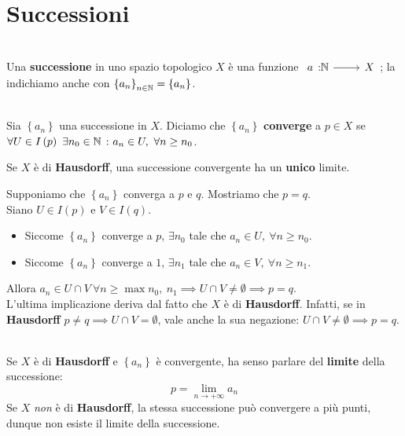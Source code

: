 \section{Successioni}
\begin{define}[Successione.]~{}\\
Una \textbf{successione} in uno spazio topologico $X$ è una funzione $\funz{a}{\naturalset}{X}$; la indichiamo anche con $\left\{a_n\right\}_{n\in\mathbb{N}}=\left\{a_n\right\}$.
\end{define}
\begin{define}~{}\\
Sia $\left\{a_n\right\}$ una successione in $X$. Diciamo che $\left\{a_n\right\}$ \textbf{converge} a $p\in X$ se $\forall U\in I\left(p\right)\ \exists n_0\in \mathbb{N}\ \colon a_n\in U,\ \forall n\geq n_0$.
\end{define}
\begin{observe}
	Se $X$ è di \textbf{Hausdorff}, una successione convergente ha un \textbf{unico} limite.
\end{observe}
\begin{demonstration}
	Supponiamo che $\left\{a_n\right\}$ converga a $p$ e $q$. Mostriamo che $p=q$.\\
	Siano $U\in I\left(p\right)$ e $V\in I\left(q\right)$.
	\begin{itemize}
		\item Siccome $\left\{a_n\right\}$ converge a $p$, $\exists n_0$ tale che $a_n\in U,\ \forall n\geq n_0$.
		\item Siccome $\left\{a_n\right\}$ converge a $1$, $\exists n_1$ tale che $a_n\in V,\ \forall n\geq n_1$.
	\end{itemize}
Allora $a_n\in U\cap V\ \forall n\geq \max{n_0,\ n_1}\implies U\cap V\neq \emptyset\implies p=q$.\\
L'ultima implicazione deriva dal fatto che $X$ è di \textbf{Hausdorff}. Infatti, se in \textbf{Hausdorff} $p\neq q\implies U\cap V = \emptyset$, vale anche la sua negazione: $U\cap V\neq \emptyset\implies p = q$.
\end{demonstration}
\begin{define}[Limite.]~{}\\
Se $X$ è di \textbf{Hausdorff} e $\left\{a_n\right\}$ è convergente, ha senso parlare del \textbf{limite} della successione:
\begin{equation}
p=\lim_{n \to +\infty}a_n
\end{equation}
Se $X$ \textit{non} è di \textbf{Hausdorff}, la stessa successione può convergere a più punti, dunque non esiste il limite della successione.
\end{define}
